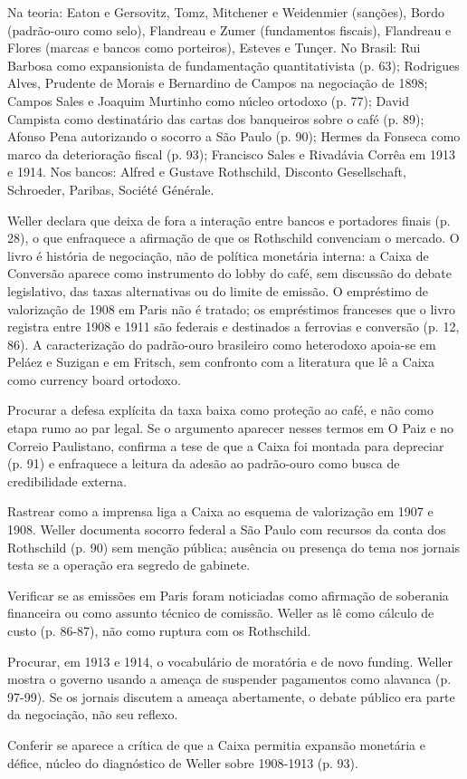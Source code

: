 
Na teoria: Eaton e Gersovitz, Tomz, Mitchener e Weidenmier (sanções), Bordo
(padrão-ouro como selo), Flandreau e Zumer (fundamentos fiscais), Flandreau e
Flores (marcas e bancos como porteiros), Esteves e Tunçer. No Brasil: Rui Barbosa
como expansionista de fundamentação quantitativista (p. 63); Rodrigues Alves,
Prudente de Morais e Bernardino de Campos na negociação de 1898; Campos Sales e
Joaquim Murtinho como núcleo ortodoxo (p. 77); David Campista como destinatário
das cartas dos banqueiros sobre o café (p. 89); Afonso Pena autorizando o socorro
a São Paulo (p. 90); Hermes da Fonseca como marco da deterioração fiscal (p. 93);
Francisco Sales e Rivadávia Corrêa em 1913 e 1914. Nos bancos: Alfred e Gustave
Rothschild, Disconto Gesellschaft, Schroeder, Paribas, Société Générale.


Weller declara que deixa de fora a interação entre bancos e portadores finais
(p. 28), o que enfraquece a afirmação de que os Rothschild convenciam o mercado.
O livro é história de negociação, não de política monetária interna: a Caixa de
Conversão aparece como instrumento do lobby do café, sem discussão do debate
legislativo, das taxas alternativas ou do limite de emissão. O empréstimo de
valorização de 1908 em Paris não é tratado; os empréstimos franceses que o livro
registra entre 1908 e 1911 são federais e destinados a ferrovias e conversão
(p. 12, 86). A caracterização do padrão-ouro brasileiro como heterodoxo apoia-se
em Peláez e Suzigan e em Fritsch, sem confronto com a literatura que lê a Caixa
como currency board ortodoxo.

\begin{dialogo}
\item Procurar a defesa explícita da taxa baixa como proteção ao café, e não como
etapa rumo ao par legal. Se o argumento aparecer nesses termos em O Paiz e no
Correio Paulistano, confirma a tese de que a Caixa foi montada para depreciar
(p. 91) e enfraquece a leitura da adesão ao padrão-ouro como busca de
credibilidade externa.
\item Rastrear como a imprensa liga a Caixa ao esquema de valorização em 1907 e
1908. Weller documenta socorro federal a São Paulo com recursos da conta dos
Rothschild (p. 90) sem menção pública; ausência ou presença do tema nos jornais
testa se a operação era segredo de gabinete.
\item Verificar se as emissões em Paris foram noticiadas como afirmação de
soberania financeira ou como assunto técnico de comissão. Weller as lê como
cálculo de custo (p. 86-87), não como ruptura com os Rothschild.
\item Procurar, em 1913 e 1914, o vocabulário de moratória e de novo funding.
Weller mostra o governo usando a ameaça de suspender pagamentos como alavanca
(p. 97-99). Se os jornais discutem a ameaça abertamente, o debate público era
parte da negociação, não seu reflexo.
\item Conferir se aparece a crítica de que a Caixa permitia expansão monetária e
défice, núcleo do diagnóstico de Weller sobre 1908-1913 (p. 93).
\end{dialogo}

